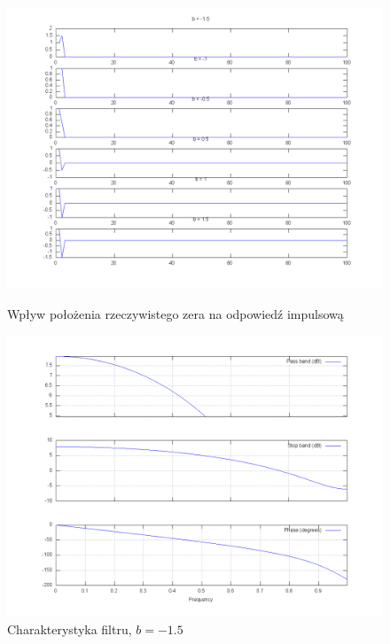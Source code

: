 \documentclass[wide,a4paper,titlepage,12pt]{mwart}
\begin{document}
  \begin{figure}[htbp]
    \begin{center}
      \includegraphics[scale=.3]{out/fig1.png}
      \caption{\label{fig1} Wpływ położenia rzeczywistego zera na odpowiedź impulsową}
      \includegraphics[scale=.3]{out/fig2.png}
      \caption{\label{fig2} Charakterystyka filtru, $b=-1.5$}

    \end{center}
  \end{figure}
\end{document}
